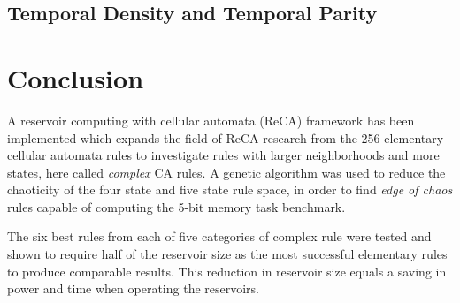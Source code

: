 \documentclass{elsarticle}
\begin{document}
\begin{multicols}{2}
\begin{figure}[H]
\label{repeat}
\end{figure}

\subsection{Temporal Density and Temporal Parity}

\section{Conclusion}\label{conclusion}


A reservoir computing with cellular automata (ReCA) framework has been 
implemented which expands the field of ReCA research from the 256 elementary 
cellular automata rules to investigate rules with larger neighborhoods and more 
states, here called \textit{complex} CA rules. A genetic algorithm was used to 
reduce the chaoticity of the four state and five state rule space, in order to 
find \textit{edge of chaos} rules capable of computing the 5-bit memory task 
benchmark. \par The six best rules from each of five categories of complex rule 
were tested and shown to require half of the reservoir size as the most 
successful elementary rules to produce comparable results. This reduction in 
reservoir size equals a saving in power and time when operating the reservoirs.  




\end{multicols}
\end{document}
